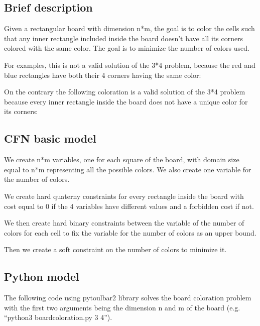 \documentclass[letterpaper,10pt,openany,oneside,english]{sphinxmanual}
\begin{document}
\subsection{Brief description}
\label{\detokenize{examples/tuto_bcp:brief-description}}
\sphinxAtStartPar
Given a rectangular board with dimension n*m, the goal is to color the cells such that any inner rectangle included inside the board doesn’t have all its corners colored with the same color.
The goal is to minimize the number of colors used.

\sphinxAtStartPar
For examples, this is not a valid solution of the 3*4 problem, because the red and blue rectangles have both their 4 corners having the same color:

\noindent{}

\sphinxAtStartPar
On the contrary the following coloration is a valid solution of the 3*4 problem because every inner rectangle inside the board does not have a unique color for its corners:

\noindent{}


\subsection{CFN basic model}
\label{\detokenize{examples/tuto_bcp:cfn-basic-model}}
\sphinxAtStartPar
We create n*m variables, one for each square of the board, with domain size equal to n*m representing all the possible colors. We also create one variable for the number of colors.

\sphinxAtStartPar
We create hard quaterny constraints for every rectangle inside the board with cost equal to 0 if the 4 variables have different values and a forbidden cost if not.

\sphinxAtStartPar
We then create hard binary constraints between the variable of the number of colors for each cell to fix the variable for the number of colors as an upper bound.

\sphinxAtStartPar
Then we create a soft constraint on the number of colors to minimize it.


\subsection{Python model}
\label{\detokenize{examples/tuto_bcp:python-model}}
\sphinxAtStartPar
The following code using pytoulbar2 library solves the board coloration problem with the first two arguments being the dimension n and m of the board (e.g. “python3 boardcoloration.py 3 4”).
\end{document}
